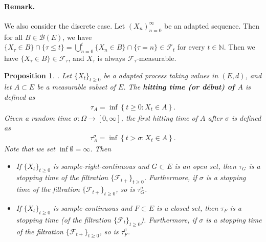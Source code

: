 \documentclass{article}
\numberwithin{equation}{section}
\theoremstyle{plain}
\newtheorem{proposition}[theorem]{Proposition}
\theoremstyle{definition}
\begin{document}
\paragraph{Remark.} We also consider the discrete case. Let $(X_n)_{n=0}^\infty$ be an adapted sequence. Then for all $B\in\mathscr{B}(E)$, we have $\{X_\tau\in B\}\cap\{\tau\leq t\} = \bigcup_{n=0}^t\{X_n\in B\}\cap\{\tau=n\}\in\mathscr{F}_t$ for every $t\in\mathbb{N}$. Then we have $\{X_\tau\in B\}\in\mathscr{F}_\tau$, and $X_\tau$ is always $\mathscr{F}_\tau$-measurable. 

\begin{proposition}\label{prop:3.13}. Let $\{X_t\}_{t\geq 0}$ be a adapted process taking values in $(E,d)$, and let $A\subset E$ be a measurable subset of $E$. The \textbf{hitting time (or début) of $A$} is defined as
\begin{align*}
	\tau_A=\inf\left\{t\geq 0:X_t\in A\right\}.
\end{align*}
Given a random time $\sigma:\Omega\to[0,\infty]$, the \textit{first hitting time of $A$ after $\sigma$} is defined as
\begin{align*}
	\tau_A^\sigma=\inf\left\{t>\sigma:X_t\in A\right\}.
\end{align*}
Note that we set $\inf\emptyset=\infty$. Then
\begin{itemize}
	\item[(i)] If $\{X_t\}_{t\geq 0}$ is sample-right-continuous and $G\subset E$ is an open set, then $\tau_G$ is a stopping time of the filtration $\{\mathscr{F}_{t+}\}_{t\geq 0}$. Furthermore, if $\sigma$ is a stopping time of the filtration $\{\mathscr{F}_{t+}\}_{t\geq 0}$, so is $\tau_G^\sigma$.
	\item[(ii)] If $\{X_t\}_{t\geq 0}$ is sample-continuous and $F\subset E$ is a closed set, then $\tau_F$ is a stopping time (of the filtration $\{\mathscr{F}_{t}\}_{t\geq 0}$). Furthermore, if $\sigma$ is a stopping time of the filtration $\{\mathscr{F}_{t+}\}_{t\geq 0}$, so is $\tau_F^\sigma$.
\end{itemize}
\end{proposition}
\end{document}
